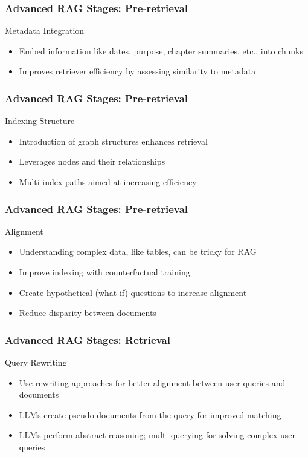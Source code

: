 \begin{frame}[fragile]\frametitle{Advanced RAG Stages: Pre-retrieval}
Metadata Integration

  \begin{itemize}
    \item Embed information like dates, purpose, chapter summaries, etc., into chunks
    \item Improves retriever efficiency by assessing similarity to metadata
  \end{itemize}
\end{frame}

\begin{frame}[fragile]\frametitle{Advanced RAG Stages: Pre-retrieval}
Indexing Structure
  \begin{itemize}
    \item Introduction of graph structures enhances retrieval
    \item Leverages nodes and their relationships
    \item Multi-index paths aimed at increasing efficiency
  \end{itemize}
\end{frame}

\begin{frame}[fragile]\frametitle{Advanced RAG Stages: Pre-retrieval}
Alignment
  \begin{itemize}
    \item Understanding complex data, like tables, can be tricky for RAG
    \item Improve indexing with counterfactual training
    \item Create hypothetical (what-if) questions to increase alignment
    \item Reduce disparity between documents
  \end{itemize}
\end{frame}

\begin{frame}[fragile]\frametitle{Advanced RAG Stages: Retrieval}
Query Rewriting
  \begin{itemize}
    \item Use rewriting approaches for better alignment between user queries and documents
    \item LLMs create pseudo-documents from the query for improved matching
    \item LLMs perform abstract reasoning; multi-querying for solving complex user queries
  \end{itemize}
\end{frame}

